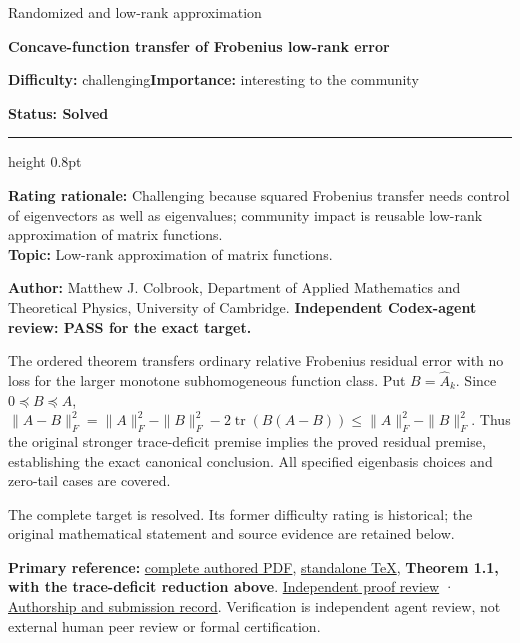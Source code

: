 \documentclass[11pt,a4paper]{article}
\makeatletter
\renewcommand{\subsection}{\Needspace{4\baselineskip}\@startsection{subsection}{2}{0pt}{9pt plus 1pt minus 1pt}{3pt}{\sffamily\bfseries\normalsize\color{ink}}}
\makeatother
\begin{document}
{\sffamily\small\color{muted}Randomized and low-rank approximation\par}
\vspace{3pt}
{\raggedright{}\sffamily\bfseries\fontsize{21}{24}\selectfont\color{ink}Concave-function
transfer of Frobenius low-rank error\par}
\vspace{7pt}
{\sffamily\small\textbf{Difficulty:} challenging\quad\textbf{Importance:} interesting
to the community\par}
{\sffamily\small\bfseries\color{accent}Status: Solved\par}
\vspace{4pt}
{\color{accent}\hrule height 0.8pt}
\vspace{6pt}
\textbf{Rating rationale:} Challenging because squared Frobenius
transfer needs control of eigenvectors as well as eigenvalues; community
impact is reusable low-rank approximation of matrix functions.\\
\textbf{Topic:} Low-rank approximation of matrix functions.

\subsection{Resolution --- 2026-09-11}\label{resolution-2026-09-11}

\textbf{Author:} Matthew J. Colbrook, Department of Applied Mathematics
and Theoretical Physics, University of Cambridge. \textbf{Independent
Codex-agent review: PASS for the exact target.}

The ordered theorem transfers ordinary relative Frobenius residual error
with no loss for the larger monotone subhomogeneous function class. Put
\(B=\widehat A_k\). Since \(0\preceq B\preceq A\),
\(\|A-B\|_F^2=\|A\|_F^2-\|B\|_F^2-2\operatorname{tr}(B(A-B))\le\|A\|_F^2-\|B\|_F^2\).
Thus the original stronger trace-deficit premise implies the proved
residual premise, establishing the exact canonical conclusion. All
specified eigenbasis choices and zero-tail cases are covered.

The complete target is resolved. Its former difficulty rating is
historical; the original mathematical statement and source evidence are
retained below.

\textbf{Primary reference:}
\href{https://github.com/ajt60gaibb/OpenProblemsInNLA/blob/main/references/colbrook-transfer-2026-09-11/manuscripts/02_frobenius_function_transfer.pdf}{complete
authored PDF},
\href{https://github.com/ajt60gaibb/OpenProblemsInNLA/blob/main/references/colbrook-transfer-2026-09-11/manuscripts/02_frobenius_function_transfer.tex}{standalone
TeX}, \textbf{Theorem 1.1, with the trace-deficit reduction above}.
\href{https://github.com/ajt60gaibb/OpenProblemsInNLA/blob/main/references/colbrook-transfer-2026-09-11/verification/reviews/RA-09-review.md}{Independent
proof review} ·
\href{https://github.com/ajt60gaibb/OpenProblemsInNLA/blob/main/references/colbrook-transfer-2026-09-11/README.md}{Authorship
and submission record}. Verification is independent agent review, not
external human peer review or formal certification.
\end{document}
